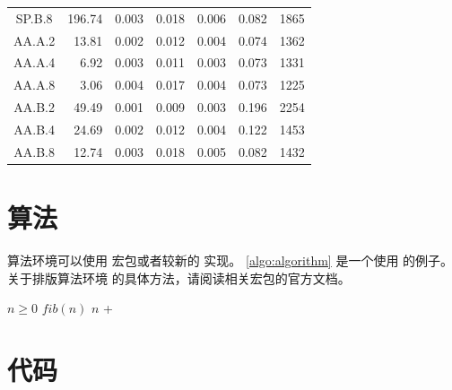 \begin{ThreePartTable}
\begin{longtable}[c]{c*{6}{r}}
    SP.B.8                 & 196.74                              & 0.003                               & 0.018          & 0.006 & 0.082 & 1865   \\
    AA.A.2                 & 13.81                               & 0.002                               & 0.012          & 0.004 & 0.074 & 1362   \\
    AA.A.4                 & 6.92                                & 0.003                               & 0.011          & 0.003 & 0.073 & 1331   \\
    AA.A.8                 & 3.06                                & 0.004                               & 0.017          & 0.004 & 0.073 & 1225   \\
    AA.B.2                 & 49.49                               & 0.001                               & 0.009          & 0.003 & 0.196 & 2254   \\
    AA.B.4                 & 24.69                               & 0.002                               & 0.012          & 0.004 & 0.122 & 1453   \\
    AA.B.8                 & 12.74                               & 0.003                               & 0.018          & 0.005 & 0.082 & 1432   \\
    \bottomrule
  \end{longtable}
\end{ThreePartTable}



\section{算法}

算法环境可以使用  宏包或者较新的  实现。
\cref{algo:algorithm} 是一个使用  的例子。关于排版算法环境
的具体方法，请阅读相关宏包的官方文档。

\begin{algorithm}
  \caption{计算斐波那契数列}\label{algo:algorithm}
  \begin{algorithmic}[1]
    \Require $n \geq 0$
    \Ensure $fib(n)$
    \State \Return $n$
    \Else
    \State \Return {} + 
    \EndIf
    \EndFunction
  \end{algorithmic}
\end{algorithm}

\section{代码}

